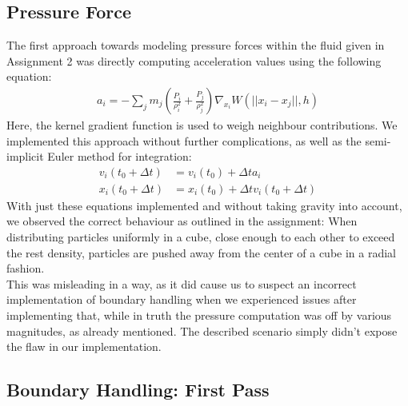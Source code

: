 \documentclass{ACGSeminar}
\begin{document}
\subsection{Pressure Force}
The first approach towards modeling pressure forces within the fluid given in Assignment 2 was directly computing acceleration values using the following equation:\\
\begin{equation} 
\begin{aligned}
a_{i} = - \sum_{j} m_{j}(\frac{P_{i}}{\rho_{i}^{2}} + \frac{P_{j}}{\rho_{j}^{2}})\nabla_{x_{i}}W(||x_{i} -
 x_{j}||, h)
\end{aligned}
\end{equation}
Here, the kernel gradient function is used to weigh neighbour contributions. 
We implemented this approach without further complications, as well as the semi-implicit Euler method for integration:
\begin{equation} 
\begin{aligned}
v_{i}(t_0 + \Delta t) &= v_i(t_0) + \Delta t  a_i \\
x_i(t_0 + \Delta t) &= x_i(t_0) + \Delta t v_i(t_0 + \Delta t)
\end{aligned}
\end{equation}
With just these equations implemented and without taking gravity into account, we observed the correct behaviour as outlined in the assignment: When distributing particles uniformly in a cube, close enough to each other to exceed the rest density, particles are pushed away from the center of a cube in a radial fashion.\\
This was misleading in a way, as it did cause us to suspect an incorrect implementation of boundary handling when we experienced issues after implementing that, while in truth the pressure computation was off by various magnitudes, as already mentioned. The described scenario simply didn't expose the flaw in our implementation.

\subsection{Boundary Handling: First Pass}
\end{document}
